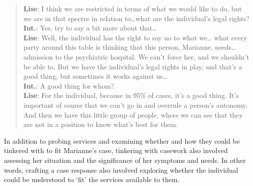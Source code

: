     \blockquote{\textnormal{\bfseries Lise}:	I think we are restricted in terms of what we would like to do, but we are in that spectre in relation to…what are the individual’s legal rights?
    \\\textnormal{\bfseries Int.}: 	Yes, try to say a bit more about that…
    \\\textnormal{\bfseries Lise}: 	Well, the individual has the right to say no to what we… what every party around this table is thinking that this person, Marianne, needs…admission to the psychiatric hospital. We can’t force her, and we shouldn’t be able to. But we have the individual’s legal rights in play, and that’s a good thing, but sometimes it works against us…
    \\\textnormal{\bfseries Int.}: 	A good thing for whom?
    \\\textnormal{\bfseries Lise}:	For the individual, because in 95\% of cases, it’s a good thing. It’s important of course that we can’t go in and overrule a person’s autonomy. And then we have this little group of people, where we can see that they are not in a position to know what’s best for them.}
In addition to probing services and examining whether and how they could be tinkered with to fit Marianne’s case, tinkering with casework also involved assessing her situation and the significance of her symptoms and needs. In other words, crafting a case response also involved exploring whether the individual could be understood to ‘fit’ the services available to them. 

